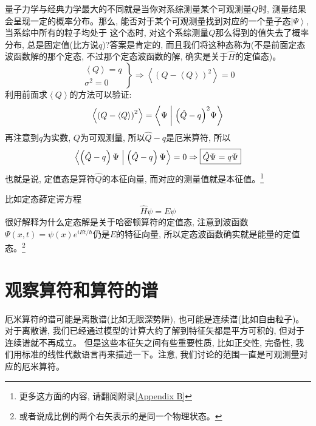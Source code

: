 \documentclass[a4paper,zihao=-4,linespread=1]{ctexrep}
\begin{document}
    量子力学与经典力学最大的不同就是当你对系综测量某个可观测量$Q$时, 测量结果会呈现一定的概率分布。那么, 能否对于某个可观测量找到对应的一个量子态$\left|\Psi\right\rangle$, 当系综中所有的粒子均处于
    这个态时, 对这个系综测量$Q$那么得到的值失去了概率分布, 总是固定值(比方说$q$)?答案是肯定的, 而且我们将这种态称为(不是前面定态波函数解的那个定态, 不过那个定态波函数的解, 确实是关于$\hat{H}$的定值态)。
    \begin{equation*}
        \left.\begin{matrix} 
            \left \langle Q \right \rangle=q \\ 
            \sigma^2=0
          \end{matrix}\right\}\Rightarrow \left \langle \left( Q-\left \langle Q \right \rangle  \right )^2\right \rangle  =0
    \end{equation*}
    利用前面求$\left\langle Q \right\rangle$的方法可以验证:
    \[\left \langle \left( Q-\left \langle Q \right \rangle  \right )^2\right \rangle =\left\langle {\Psi }
    \mathrel{\left | {\vphantom {\Psi  {{{\left( {\hat Q - q} \right)}^2}\Psi }}}
    \right. \kern-\nulldelimiterspace}
    {{{{\left( {\hat Q - q} \right)}^2}\Psi }} \right\rangle \]
    再注意到$q$为实数, $Q$为可观测量, 所以$\hat{Q}-q$是厄米算符, 所以
    \[\left\langle {{\left( {\hat Q - q} \right)\Psi }}
    \mathrel{\left | {\vphantom {{\left( {\hat Q - q} \right)\Psi } {\left( {\hat Q - q} \right)\Psi }}}
    \right. \kern-\nulldelimiterspace}
    {{\left( {\hat Q - q} \right)\Psi }} \right\rangle =0\Rightarrow
    \boxed{\hat{Q}\Psi=q\Psi}\]
    也就是说, 定值态是算符$\hat{Q}$的本征向量, 而对应的测量值就是本征值。\footnote{更多这方面的内容, 请翻阅附录\ref{Appendix B}}

    比如定态薛定谔方程$$\hat{H}\psi=E\psi$$
    很好解释为什么定态解是关于哈密顿算符的定值态, 注意到波函数$\Psi(x,t)=\psi(x)e^{iEt/\hbar}$仍是$E$的特征向量, 所以定态波函数确实就是能量的定值态。\footnote{或者说成比例的两个右矢表示的是同一个物理状态。}
    \section{观察算符和算符的谱}
    厄米算符的谱可能是离散谱(比如无限深势阱), 也可能是连续谱(比如自由粒子)。对于离散谱, 我们已经通过模型的计算大约了解到特征矢都是平方可积的, 但对于连续谱就不再成立。
    但是这些本征矢之间有些重要性质, 比如正交性, 完备性, 我们用标准的线性代数语言再来描述一下。注意, 我们讨论的范围一直是可观测量对应的厄米算符。
\end{document}
